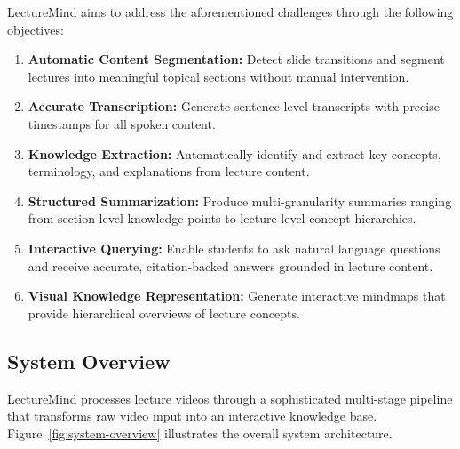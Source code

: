 \documentclass[12pt,a4paper]{article}
\begin{document}
LectureMind aims to address the aforementioned challenges through the following objectives:

\begin{enumerate}
    \item \textbf{Automatic Content Segmentation:} Detect slide transitions and segment lectures into meaningful topical sections without manual intervention.
    \item \textbf{Accurate Transcription:} Generate sentence-level transcripts with precise timestamps for all spoken content.
    \item \textbf{Knowledge Extraction:} Automatically identify and extract key concepts, terminology, and explanations from lecture content.
    \item \textbf{Structured Summarization:} Produce multi-granularity summaries ranging from section-level knowledge points to lecture-level concept hierarchies.
    \item \textbf{Interactive Querying:} Enable students to ask natural language questions and receive accurate, citation-backed answers grounded in lecture content.
    \item \textbf{Visual Knowledge Representation:} Generate interactive mindmaps that provide hierarchical overviews of lecture concepts.
\end{enumerate}

\subsection{System Overview}

LectureMind processes lecture videos through a sophisticated multi-stage pipeline that transforms raw video input into an interactive knowledge base. Figure~\ref{fig:system-overview} illustrates the overall system architecture.
\end{document}
